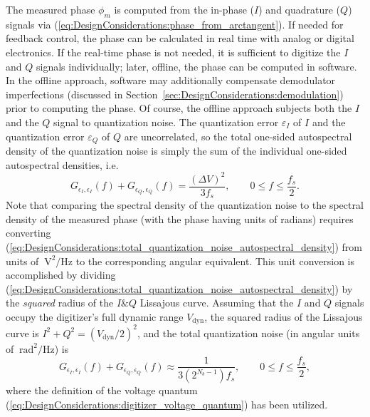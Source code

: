 The measured phase $\phi_m$ is computed from
the in-phase ($I$) and quadrature ($Q$) signals via
(\ref{eq:DesignConsiderations:phase_from_arctangent}).
If needed for feedback control,
the phase can be calculated in real time
with analog or digital electronics.
If the real-time phase is not needed,
it is sufficient to digitize the $I$ and $Q$ signals individually;
later, offline, the phase can be computed in software.
In the offline approach,
software may additionally compensate demodulator imperfections
(discussed in Section~\ref{sec:DesignConsiderations:demodulation})
prior to computing the phase.
Of course, the offline approach
subjects both the $I$ and the $Q$ signal to quantization noise.
The quantization error $\varepsilon_I$ of $I$ and
the quantization error $\varepsilon_Q$ of $Q$
are uncorrelated, so
the total one-sided autospectral density of the quantization noise is simply
the sum of the individual one-sided autospectral densities, i.e.\
\begin{equation}
  G_{\epsilon_I,\epsilon_I}(f)
  +
  G_{\epsilon_Q,\epsilon_Q}(f)
  =
  \frac{(\Delta V)^2}{3 f_s},
  \qquad
  0 \leq f \leq \frac{f_s}{2}.
  \label{eq:DesignConsiderations:total_quantization_noise_autospectral_density}
\end{equation}
Note that comparing the spectral density of the quantization noise
to the spectral density of the measured phase
(with the phase having units of radians)
requires converting
(\ref{eq:DesignConsiderations:total_quantization_noise_autospectral_density})
from units of $\SI{}{\volt\squared\per\Hz}$
to the corresponding angular equivalent.
This unit conversion is accomplished by dividing
(\ref{eq:DesignConsiderations:total_quantization_noise_autospectral_density})
by the \emph{squared} radius of the $I\&Q$ Lissajous curve.
Assuming that the $I$ and $Q$ signals occupy
the digitizer's full dynamic range $V_{\text{dyn}}$,
the squared radius of the Lissajous curve is
$I^2 + Q^2 = (V_{\text{dyn}} / 2)^2$, and
the total quantization noise
(in angular units of $\SI{}{\radian\squared\per\Hz}$) is
\begin{equation}
  G_{\epsilon_I,\epsilon_I}(f)
  +
  G_{\epsilon_Q,\epsilon_Q}(f)
  \approx
  \frac{1}{3 (2^{N_b - 1}) f_s},
  \qquad
  0 \leq f \leq \frac{f_s}{2},
  \label{eq:DesignConsiderations:total_quantization_noise_autospectral_density_angular_units}
\end{equation}
where the definition of the voltage quantum
(\ref{eq:DesignConsiderations:digitizer_voltage_quantum})
has been utilized.


